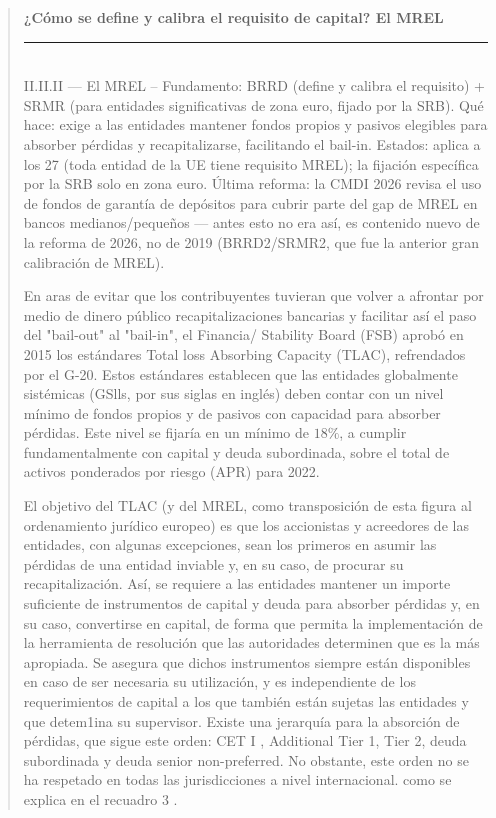 \documentclass[10pt,a4paper]{article}
\newenvironment{specialblock}[1]{%
      \begin{quote} %
      \small %
      \noindent\textbf{#1}\\[-0.3em] %
      \rule{\linewidth}{0.4pt}\\[0.6em]}{
      \end{quote}}
\begin{document}
\begin{specialblock}{¿Cómo se define y calibra el requisito de capital? El MREL}
    II.II.II — El MREL -- Fundamento: BRRD (define y calibra el requisito) + SRMR (para entidades significativas de zona euro, fijado por la SRB). Qué hace: exige a las entidades mantener fondos propios y pasivos elegibles para absorber pérdidas y recapitalizarse, facilitando el bail-in. Estados: aplica a los 27 (toda entidad de la UE tiene requisito MREL); la fijación específica por la SRB solo en zona euro. Última reforma: la CMDI 2026 revisa el uso de fondos de garantía de depósitos para cubrir parte del gap de MREL en bancos medianos/pequeños — antes esto no era así, es contenido nuevo de la reforma de 2026, no de 2019 (BRRD2/SRMR2, que fue la anterior gran calibración de MREL).

    En aras de evitar que los contribuyentes tuvieran que volver a afrontar por medio de dinero público recapitalizaciones bancarias y facilitar así el paso del "bail-out" al "bail-in", el Financia/ Stability Board (FSB) aprobó en 2015 los estándares Total loss Absorbing Capacity (TLAC), refrendados por el G-20. Estos estándares establecen que las entidades globalmente sistémicas (GSlls, por sus siglas en inglés) deben contar con un nivel mínimo de fondos propios y de pasivos con capacidad para absorber pérdidas. Este nivel se fijaría en un mínimo de $18\%$, a cumplir fundamentalmente con capital y deuda subordinada, sobre el total de activos ponderados por riesgo (APR) para 2022.

    El objetivo del TLAC (y del MREL, como transposición de esta figura al ordenamiento jurídico europeo) es que los accionistas y acreedores de las entidades, con algunas excepciones, sean los primeros en asumir las pérdidas de una entidad inviable y, en su caso, de procurar su recapitalización. Así, se requiere a las entidades mantener un importe suficiente de instrumentos de capital y deuda para absorber pérdidas y, en su caso, convertirse en capital, de forma que permita la implementación de la herramienta de resolución que las autoridades determinen que es la más apropiada. Se asegura que dichos instrumentos siempre están disponibles en caso de ser necesaria su utilización, y es independiente de los requerimientos de capital a los que también están sujetas las entidades y que detem1ina su supervisor. Existe una jerarquía para la absorción de pérdidas, que sigue este orden: CET I , Additional Tier 1, Tier 2, deuda subordinada y deuda senior non-preferred. No obstante, este orden no se ha respetado en todas las jurisdicciones a nivel internacional. como se explica en el recuadro 3 . 


\end{specialblock}
\end{document}
